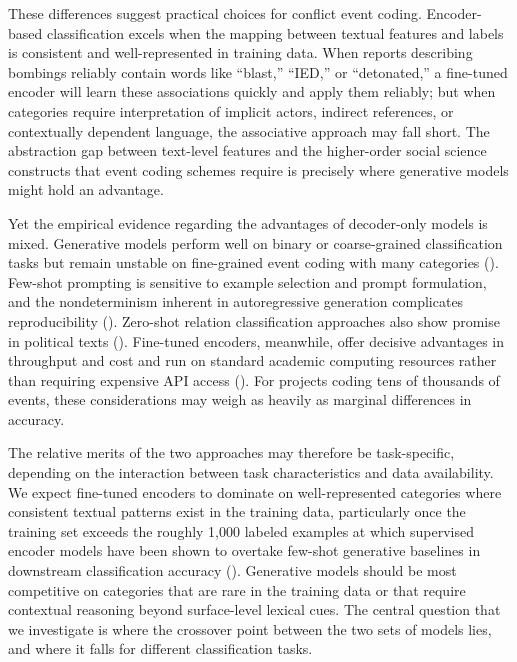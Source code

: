 \documentclass[
  11pt,
]{article}
\begin{document}
These differences suggest practical choices for conflict event coding.
Encoder-based classification excels when the mapping between textual
features and labels is consistent and well-represented in training data.
When reports describing bombings reliably contain words like ``blast,''
``IED,'' or ``detonated,'' a fine-tuned encoder will learn these
associations quickly and apply them reliably; but when categories
require interpretation of implicit actors, indirect references, or
contextually dependent language, the associative approach may fall
short. The abstraction gap between text-level features and the
higher-order social science constructs that event coding schemes require
is precisely where generative models might hold an advantage.

Yet the empirical evidence regarding the advantages of decoder-only
models is mixed. Generative models perform well on binary or
coarse-grained classification tasks but remain unstable on fine-grained
event coding with many categories (). Few-shot prompting is sensitive to example selection and prompt
formulation, and the nondeterminism inherent in autoregressive
generation complicates reproducibility
(). Zero-shot
relation classification approaches also show promise in political texts
(). Fine-tuned encoders,
meanwhile, offer decisive advantages in throughput and cost and run on
standard academic computing resources rather than requiring expensive
API access (). For projects
coding tens of thousands of events, these considerations may weigh as
heavily as marginal differences in accuracy.

The relative merits of the two approaches may therefore be
task-specific, depending on the interaction between task characteristics
and data availability. We expect fine-tuned encoders to dominate on
well-represented categories where consistent textual patterns exist in
the training data, particularly once the training set exceeds the
roughly 1,000 labeled examples at which supervised encoder models have
been shown to overtake few-shot generative baselines in downstream
classification accuracy (). Generative models should be most competitive on categories that
are rare in the training data or that require contextual reasoning
beyond surface-level lexical cues. The central question that we
investigate is where the crossover point between the two sets of models
lies, and where it falls for different classification tasks.
\end{document}
